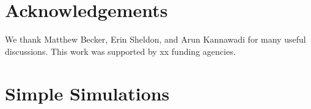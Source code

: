 {\section{Acknowledgements}

We thank Matthew Becker, Erin Sheldon, and Arun Kannawadi for many useful discussions. This work was supported by xx funding agencies.


 










\appendix

\section{Simple Simulations}
\label{app:coadd_F}



}
